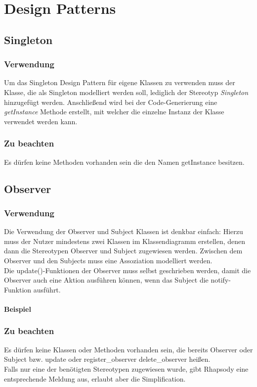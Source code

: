 \chapter{Design Patterns}

\section{Singleton}

\subsection{Verwendung}

Um das Singleton Design Pattern für eigene Klassen zu verwenden muss der Klasse, die als Singleton modelliert werden soll, lediglich der Stereotyp \textit{Singleton} hinzugefügt werden. Anschließend wird bei der Code-Generierung eine \textit{getInstance} Methode erstellt, mit welcher die einzelne Instanz der Klasse verwendet werden kann.

\subsection{Zu beachten}

Es dürfen keine Methoden vorhanden sein die den Namen getInstance besitzen.\\

\section{Observer}

\subsection{Verwendung}

Die Verwendung der Observer und Subject Klassen ist denkbar einfach: Hierzu muss
der Nutzer mindestens zwei Klassen im Klassendiagramm erstellen, denen dann die
Stereotypen Observer und Subject zugewiesen werden. Zwischen dem Observer und
den Subjects muss eine Assoziation modelliert werden. \\
Die update()-Funktionen der Observer muss selbst geschrieben werden, damit die
Observer auch eine Aktion ausführen können, wenn das Subject die notify-Funktion ausführt.

\subsubsection{Beispiel}

\subsection{Zu beachten}

Es dürfen keine Klassen oder Methoden vorhanden sein, die bereits Observer oder
Subject bzw. update oder register_observer delete_observer heißen.\\

Falls nur eine der benötigten Stereotypen zugewiesen wurde, gibt Rhapsody eine
entsprechende Meldung aus, erlaubt aber die Simplification.\\

